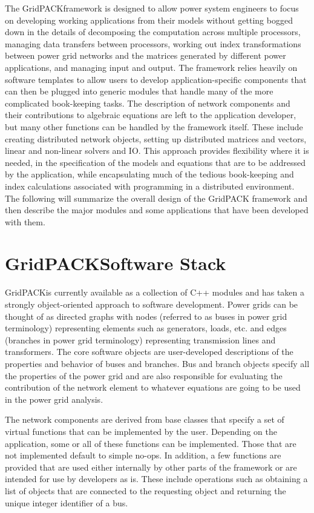 \documentclass[preprint]{acm_proc_article-sp}
\begin{document}
The GridPACK\texttrademark framework is designed to allow power
system engineers to focus on developing working applications from their
models without getting bogged down in the details of decomposing the computation
across multiple processors, managing data transfers between processors, working out
index transformations between power grid networks and the matrices generated by
different power applications, and managing input and output. The framework
relies heavily on software templates to allow users to develop
application-specific components that can then be plugged into generic modules
that handle many of the more complicated book-keeping tasks. The description of
network components and their contributions to algebraic equations are left to
the application developer, but many other functions can be handled by the
framework itself. These include creating distributed
network objects, setting up distributed matrices and vectors, linear and
non-linear solvers and IO. This approach provides
flexibility where it is needed, in the specification of the models and equations
that are to be addressed by the application, while encapsulating much of the
tedious book-keeping and index calculations associated with programming in a
distributed environment.
The following will summarize the overall design of the GridPACK\texttrademark
framework and then describe the major modules and some applications that have
been developed with them.

\section{GridPACK\texttrademark Software Stack}
GridPACK\texttrademark is currently available as a collection of C++ modules and
has taken a strongly object-oriented approach to software development. Power
grids can be thought of as directed graphs with nodes (referred to as buses in
power grid terminology) representing elements such as generators, loads, etc.
and edges (branches in power grid terminology) representing transmission lines
and  transformers. The core software objects are user-developed descriptions of
the properties and behavior of buses and branches. Bus and branch objects
specify all the properties of the power grid and are also responsible for
evaluating the contribution of the network element to whatever equations are
going to be used in the power grid analysis.

The network components are derived from base classes that specify a set
of virtual functions that can be implemented by the user. Depending on the
application, some or all of these functions can be implemented. Those that are
not implemented default to simple no-ops. In addition, a few functions are
provided that are used either internally by other parts of the framework or are
intended for use by developers as is. These include operations such as obtaining
a list of objects that are connected to the requesting object and returning the
unique integer identifier of a bus.
\end{document}
